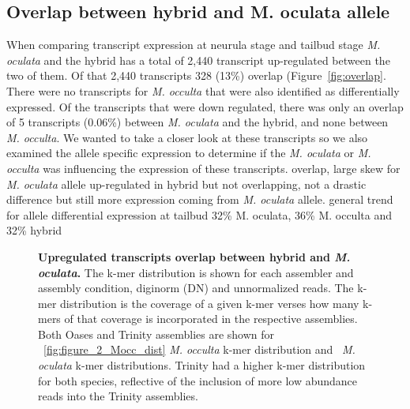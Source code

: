 \subsection{Overlap between hybrid and M. oculata allele }
When comparing transcript expression at neurula stage and tailbud stage \textit{M. oculata} and the hybrid has a total of 2,440 transcript up-regulated between the two of them. Of that 2,440 transcripts 328 (13\%) overlap (Figure~\ref{fig:overlap}. There were no transcripts for \textit{M. occulta} that were also identified as differentially expressed. Of the transcripts that were down regulated, there was only an overlap of 5 transcripts (0.06\%) between \textit{M. oculata} and the hybrid, and none between \textit{M. occulta}. We wanted to take a closer look at these transcripts so we also examined the allele specific expression to determine if the \textit{M. oculata} or \textit{M. occulta} was influencing the expression of these transcripts. 
overlap, large skew for \textit{M. oculata} allele
up-regulated in hybrid but not overlapping, not a drastic difference but still more expression coming from \textit{M. oculata} allele.
general trend for allele differential expression at tailbud 32\% M. oculata, 36\% M. occulta and 32\% hybrid

\begin{figure}[!ht]
	\caption{\textbf{Upregulated transcripts overlap between hybrid and \textit{M. oculata}.} The k-mer distribution is shown for each assembler and assembly condition, diginorm (DN) and unnormalized reads. The k-mer distribution is the coverage of a given k-mer verses how many k-mers of that coverage is incorporated in the respective assemblies. Both Oases and Trinity assemblies are shown for ~\ref{fig:figure_2_Mocc_dist} \textit{M. occulta} k-mer distribution and  ~\textit{M. oculata} k-mer distributions. Trinity had a higher k-mer distribution for both species, reflective of the inclusion of more low abundance reads into the Trinity assemblies.}	
	\label{fig:upreg_tb}
\end{figure}

